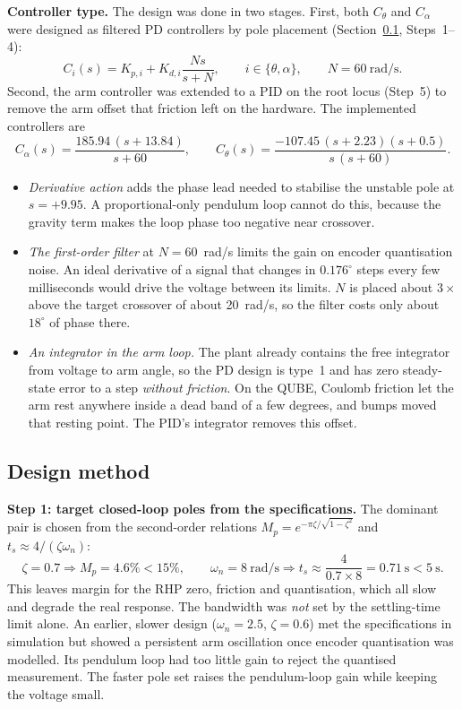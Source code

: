 \documentclass[11pt,a4paper]{article}
\begin{document}
\textbf{Controller type.} The design was done in two stages. First, both
$C_\theta$ and $C_\alpha$ were designed as filtered PD controllers by pole
placement (Section~\ref{sec:cs1design}, Steps~1--4):
\begin{equation}\label{eq:pd}
C_i(s)=K_{p,i}+K_{d,i}\frac{Ns}{s+N},\qquad i\in\{\theta,\alpha\},\qquad
N=60~\mathrm{rad/s}.
\end{equation}
Second, the arm controller was extended to a PID on the root locus
(Step~5) to remove the arm offset that friction left on the hardware. The
implemented controllers are
\begin{equation}\label{eq:cs1final}
C_\alpha(s)=\frac{185.94\,(s+13.84)}{s+60},\qquad
C_\theta(s)=\frac{-107.45\,(s+2.23)(s+0.5)}{s\,(s+60)}.
\end{equation}
\begin{itemize}[nosep]
\item \emph{Derivative action} adds the phase lead needed to stabilise the
  unstable pole at $s=+9.95$. A proportional-only pendulum loop cannot do
  this, because the gravity term makes the loop phase too negative near
  crossover.
\item \emph{The first-order filter} at $N=60$~rad/s limits the gain on
  encoder quantisation noise. An ideal derivative of a signal that changes
  in $0.176^\circ$ steps every few milliseconds would drive the voltage
  between its limits. $N$ is placed about $3\times$ above the target
  crossover of about 20~rad/s, so the filter costs only about $18^\circ$ of
  phase there.
\item \emph{An integrator in the arm loop.} The plant already contains
  the free integrator from voltage to arm angle, so the PD design is type~1
  and has zero steady-state error to a step \emph{without friction}. On
  the QUBE, Coulomb friction let the arm rest anywhere inside a dead band
  of a few degrees, and bumps moved that resting point. The PID's
  integrator removes this offset.
\end{itemize}

\subsection{Design method}\label{sec:cs1design}
\textbf{Step 1: target closed-loop poles from the specifications.} The
dominant pair is chosen from the second-order relations
$M_p=e^{-\pi\zeta/\sqrt{1-\zeta^2}}$ and $t_s\approx4/(\zeta\omega_n)$:
\begin{equation}
\zeta=0.7\Rightarrow M_p=4.6\%<15\%,\qquad
\omega_n=8~\mathrm{rad/s}\Rightarrow t_s\approx\frac{4}{0.7\times8}=0.71~\mathrm s<5~\mathrm s.
\end{equation}
This leaves margin for the RHP zero, friction and quantisation, which all
slow and degrade the real response. The bandwidth was \emph{not} set by
the settling-time limit alone. An earlier, slower design ($\omega_n=2.5$,
$\zeta=0.6$) met the specifications in simulation but showed a persistent
arm oscillation once encoder quantisation was modelled. Its pendulum loop
had too little gain to reject the quantised measurement. The faster pole
set raises the pendulum-loop gain while keeping the voltage small.
\end{document}
